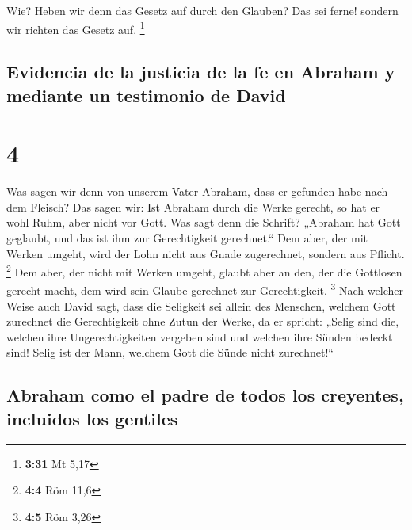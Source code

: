  Wie? Heben wir denn das Gesetz auf durch den Glauben?
Das sei ferne! sondern wir richten das Gesetz auf. \footnote{\textbf{3:31}
  Mt 5,17}

\hypertarget{evidencia-de-la-justicia-de-la-fe-en-abraham-y-mediante-un-testimonio-de-david}{%
\subsection{Evidencia de la justicia de la fe en Abraham y mediante un
testimonio de
David}\label{evidencia-de-la-justicia-de-la-fe-en-abraham-y-mediante-un-testimonio-de-david}}

\hypertarget{section-3}{%
\section{4}\label{section-3}}

 Was sagen wir denn von unserem Vater Abraham, dass er
gefunden habe nach dem Fleisch?  Das sagen wir: Ist
Abraham durch die Werke gerecht, so hat er wohl Ruhm, aber nicht vor
Gott.  Was sagt denn die Schrift? „Abraham hat Gott
geglaubt, und das ist ihm zur Gerechtigkeit gerechnet.`` 
Dem aber, der mit Werken umgeht, wird der Lohn nicht aus Gnade
zugerechnet, sondern aus Pflicht. \footnote{\textbf{4:4} Röm 11,6}
 Dem aber, der nicht mit Werken umgeht, glaubt aber an
den, der die Gottlosen gerecht macht, dem wird sein Glaube gerechnet zur
Gerechtigkeit. \footnote{\textbf{4:5} Röm 3,26}  Nach
welcher Weise auch David sagt, dass die Seligkeit sei allein des
Menschen, welchem Gott zurechnet die Gerechtigkeit ohne Zutun der Werke,
da er spricht:  „Selig sind die, welchen ihre
Ungerechtigkeiten vergeben sind und welchen ihre Sünden bedeckt sind!
 Selig ist der Mann, welchem Gott die Sünde nicht
zurechnet!{}``

\hypertarget{abraham-como-el-padre-de-todos-los-creyentes-incluidos-los-gentiles}{%
\subsection{Abraham como el padre de todos los creyentes, incluidos los
gentiles}\label{abraham-como-el-padre-de-todos-los-creyentes-incluidos-los-gentiles}}

